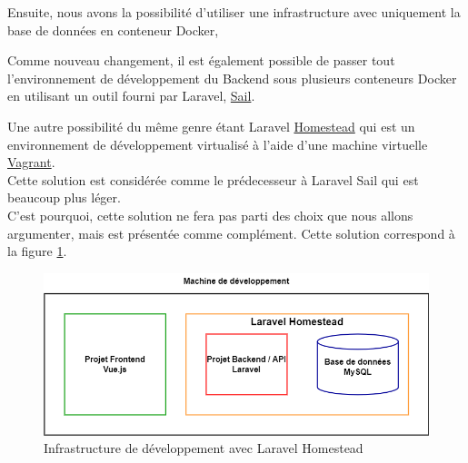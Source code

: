 \documentclass[
    iai, %
    il, %
]{heig-tb}
\begin{document}
Ensuite, nous avons la possibilité d'utiliser une infrastructure avec uniquement la base de données
en conteneur Docker, %

Comme nouveau changement, il est également possible de passer tout l'environnement de développement
du Backend sous plusieurs conteneurs Docker en utilisant un outil fourni par Laravel, \href{https://laravel.com/docs/9.x/sail}{Sail}.

Une autre possibilité du même genre étant Laravel
\href{https://laravel.com/docs/9.x/homestead}{Homestead} qui est un environnement de développement
virtualisé à l'aide d'une machine virtuelle \href{https://www.vagrantup.com/}{Vagrant}.\\
Cette solution est considérée comme le prédecesseur à Laravel Sail qui est beaucoup plus léger.\\
C'est pourquoi, cette solution ne fera pas parti des choix que nous allons argumenter, mais est
présentée comme complément. Cette solution correspond à la figure \ref{infrastructure-dev-laravel-homestead.drawio}.
\begin{center}
    \begin{figure}
        \includegraphics[width=\textwidth]{./assets/figures/infrastructure-dev-laravel-homestead.drawio.png}
        \caption{Infrastructure de développement avec Laravel Homestead \label{infrastructure-dev-laravel-homestead.drawio}}
    \end{figure}
\end{center}
\end{document}
